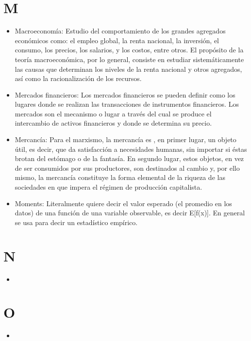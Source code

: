 \documentclass{article}
\begin{document}
\section{M}
\begin{itemize}

\item Macroeconomía: Estudio del comportamiento de los grandes agregados económicos como: el empleo global, la renta nacional, la inversión, el consumo, los precios, los salarios, y los costos, entre otros. El propósito de la teoría macroeconómica, por lo general, consiste en estudiar sistemáticamente las causas que determinan los niveles de la renta nacional y otros agregados, así como la racionalización de los recursos. 

\item Mercados financieros: Los mercados financieros se pueden definir como los lugares donde se realizan las transacciones de instrumentos financieros. Los mercados son el mecanismo o lugar a través del cual se produce el intercambio de activos financieros y donde se determina su precio.

\item Mercancía: Para el marxismo, la mercancía es , en primer lugar, un objeto útil, es decir, que da satisfacción a necesidades humanas, sin importar si éstas brotan del estómago o de la fantasía. En segundo lugar, estos objetos, en vez de ser consumidos por sus productores, son destinados al cambio y, por ello mismo, la mercancía constituye la forma elemental de la riqueza de las sociedades en que impera el régimen de producción capitalista. 

\item Moments: Literalmente quiere decir el valor esperado (el promedio en los datos) de una función de una variable observable, es decir E[f(x)]. En general se usa para decir un estadístico empírico.

\end{itemize}

\section{N}
\begin{itemize}

\item

\end{itemize}

\section{O}
\begin{itemize}

\item

\end{itemize}
\end{document}
